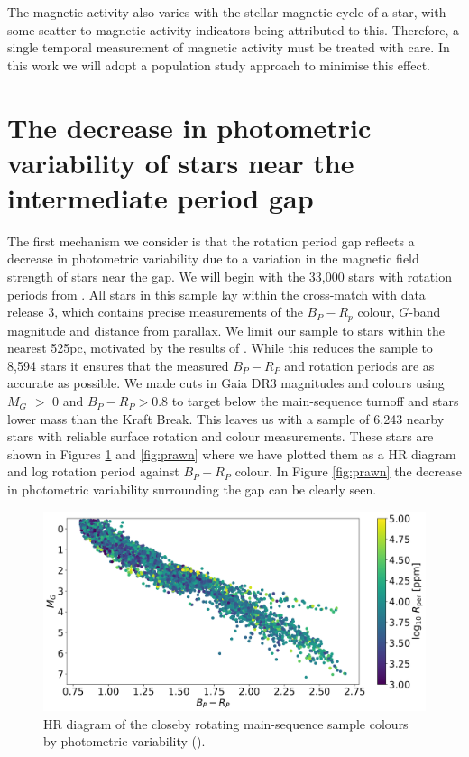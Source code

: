 The magnetic activity also varies with the stellar magnetic cycle of a star, with some scatter to magnetic activity indicators being attributed to this.
Therefore, a single temporal measurement of magnetic activity must be treated with care.
In this work we will adopt a population study approach to minimise this effect.

\section{The decrease in photometric variability of stars near the intermediate period gap}

The first mechanism we consider is that the rotation period gap reflects a decrease in photometric variability due to a variation in the magnetic field strength of stars near the gap.
We will begin with the 33,000 stars with rotation periods from \citet{mcquillan_rotation_2014}.
All stars in this sample lay within the cross-match with \gaia data release 3, which contains precise measurements of the $B_P - R_p$ colour, $G$-band magnitude and distance from parallax.
We limit our sample to stars within the nearest 525pc, motivated by the results of \citet{davenport_rotating_2018}.
While this reduces the sample to 8,594 stars it ensures that the measured $B_P - R_P$ and rotation periods are as accurate as possible.
We made cuts in Gaia DR3 magnitudes and colours using $M_G$ $>$ 0 and $B_P - R_P > 0.8$ to target below the main-sequence turnoff and stars lower mass than the Kraft Break.
This leaves us with a sample of 6,243 nearby stars with reliable surface rotation and colour measurements.
These stars are shown in Figures \ref{fig:hr} and \ref{fig:prawn} where we have plotted them as a HR diagram and log rotation period against $B_P-R_P$ colour.
In Figure \ref{fig:prawn} the decrease in photometric variability surrounding the gap can be clearly seen.

\begin{figure}
\centering
    \includegraphics[width=\textwidth]{Figures/rot_gap_figures/HR.png}
    \caption{
    HR diagram of the closeby rotating main-sequence sample colours by photometric variability (\rper{}).}
    \label{fig:hr}
\end{figure}

